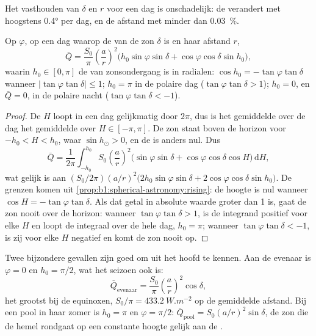 Het vasthouden van $\delta$ en $r$ voor een dag is onschadelijk: de  verandert met hoogstens \ang{0.4} per dag, en de afstand met minder dan \qty{0.03}{\percent}.

\begin{theorem}\label{thm:b1:radiation-heat-transport:daily}
Op  $\varphi$, op een dag waarop de  van de zon $\delta$ is en haar afstand $r$,
\[
  \bar Q = \frac{S_0}{\pi}\left(\frac{a}{r}\right)^{2}
  \bigl(h_0\sin\varphi\sin\delta + \cos\varphi\cos\delta\sin h_0\bigr),
\]
waarin $h_0 \in [0, \pi]$ de  van zonsondergang is in radialen: $\cos h_0 =
-\tan\varphi\tan\delta$ wanneer $|\tan\varphi\tan\delta| \le 1$; $h_0 = \pi$ in de polaire dag ($\tan\varphi\tan\delta > 1$); $h_0 = 0$, en $\bar Q = 0$, in de polaire nacht ($\tan\varphi\tan\delta < -1$).
\end{theorem}

\begin{proof}
De  $H$ loopt in een dag gelijkmatig door $2\pi$, dus is het gemiddelde over de dag het gemiddelde over $H \in [-\pi, \pi]$. De zon staat boven de horizon voor $-h_0 < H < h_0$, waar $\sin h_\odot > 0$, en de  is anders nul. Dus
\[
  \bar Q = \frac{1}{2\pi}\int_{-h_0}^{h_0} S_0\left(\frac{a}{r}\right)^{2}
  \bigl(\sin\varphi\sin\delta + \cos\varphi\cos\delta\cos H\bigr)\,\mathrm dH ,
\]
wat gelijk is aan $(S_0/2\pi)(a/r)^2\bigl(2h_0\sin\varphi\sin\delta +
2\cos\varphi\cos\delta\sin h_0\bigr)$.
De grenzen komen uit \cref{prop:b1:spherical-astronomy:rising}: de hoogte is nul wanneer $\cos H = -\tan\varphi\tan\delta$. Als dat getal in absolute waarde groter dan 1 is, gaat de zon nooit over de horizon: wanneer $\tan\varphi\tan\delta > 1$, is de integrand positief voor elke $H$ en loopt de integraal over de hele dag, $h_0 = \pi$; wanneer $\tan\varphi\tan\delta < -1$, is zij voor elke $H$ negatief en komt de zon nooit op.
\end{proof}

Twee bijzondere gevallen zijn goed om uit het hoofd te kennen. Aan de evenaar is $\varphi = 0$ en $h_0 = \pi/2$, wat het seizoen ook is:
\[
  \bar Q_\text{evenaar} = \frac{S_0}{\pi}\left(\frac{a}{r}\right)^{2}\cos\delta ,
\]
het grootst bij de equinoxen, $S_0/\pi = \qty{433.2}{W.m^{-2}}$ op de gemiddelde afstand. Bij een pool in haar zomer is $h_0 = \pi$ en $\varphi = \pi/2$: $\bar Q_\text{pool} =
S_0(a/r)^2\sin\delta$, de zon die de hemel rondgaat op een constante hoogte gelijk aan de .

